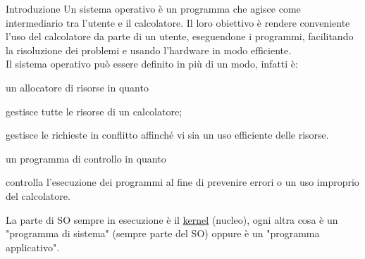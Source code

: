 \documentclass[9pt]{extarticle}
\begin{document}
	\begin{myDocument}{Introduzione}
Un sistema operativo è un programma che agisce come intermediario tra l'utente e il calcolatore. Il loro obiettivo è rendere conveniente l'uso del calcolatore da parte di un utente, eseguendone i programmi, facilitando la risoluzione dei problemi e usando l'hardware in modo efficiente.\\
\medskip
Il sistema operativo può essere definito in più di un modo, infatti è:
		\begin{descr}{1}
			\item[un allocatore di risorse] in quanto
			\begin{bullist} 
				\item gestisce tutte le risorse di un calcolatore;
				\item gestisce le richieste in conflitto affinché vi sia un uso efficiente delle risorse. 
			\end{bullist} 
			\item[un programma di controllo] in quanto
			\begin{bullist} 
				\item controlla l'esecuzione dei programmi al fine di prevenire errori o un uso improprio del calcolatore.
			\end{bullist}
		\end{descr}

La parte di SO sempre in esecuzione è il \underline{kernel} (nucleo), ogni altra cosa è un "programma di sistema" (sempre parte del SO) oppure è un "programma applicativo".
	\end{myDocument}
\end{document}
